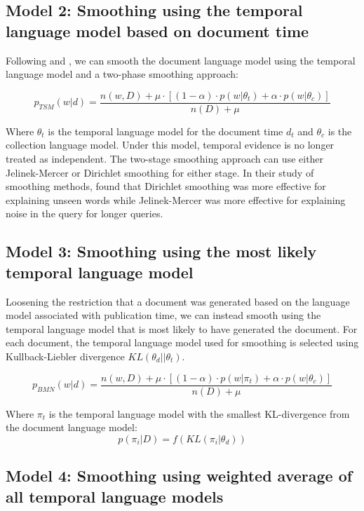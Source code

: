 \documentclass{sig-alternate}
\begin{document}
\subsection{Model 2: Smoothing using the temporal language model based on document time}

Following \cite{Liu2004} and \cite{Wei2006}, we can smooth the document language model using the temporal language model and a two-phase smoothing approach:

\[
p_{TSM}(w \vert d) = \dfrac{n(w,D) + \mu \cdot \left[ (1-\alpha) \cdot p(w\vert \theta_t) + \alpha \cdot p(w \vert \theta_c)\right]}{n(D) + \mu}
\]

Where $\theta_t$ is the temporal language model for the document time $d_t$ and  $\theta_c$ is the collection language model. Under this model, temporal evidence is no longer treated as independent. The two-stage smoothing approach can use either Jelinek-Mercer or Dirichlet smoothing for either stage.  In their study of smoothing methods, \cite{Zhai2004} found that Dirichlet smoothing was more effective for explaining unseen words while Jelinek-Mercer was more effective for explaining noise in the query for longer queries.

\subsection{Model 3: Smoothing using the most likely temporal language model}

Loosening the restriction that a document was generated based on the language model associated with publication time, we can instead smooth using the temporal language model that is most likely to have generated the document. For each document, the temporal language model used for smoothing is selected using Kullback-Liebler divergence $KL(\theta_d || \theta_t)$.

\[
p_{BMN}(w \vert d) = \dfrac{n(w,D) + \mu \cdot \left[ (1-\alpha) \cdot p(w\vert \pi_t) + \alpha \cdot p(w \vert \theta_c)\right]}{n(D) + \mu}
\]

Where $\pi_t$ is the temporal language model with the smallest KL-divergence from the document language model:
\[
p(\pi_i \vert D) = f(KL(\pi_i \vert \theta_d))
\]

\subsection{Model 4: Smoothing using weighted average of all temporal language models}
\end{document}
